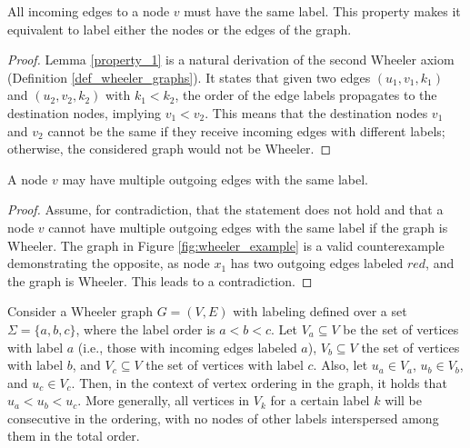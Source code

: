 \begin{lemma} \label{property_1}
    All incoming edges to a node $v$ must have the same label. This property makes it equivalent to label either the nodes or the edges of the graph.
\end{lemma}

\begin{proof}
    Lemma \ref{property_1} is a natural derivation of the second Wheeler axiom (Definition \ref{def_wheeler_graphs}). It states that given two edges $(u_1,v_1,k_1)$ and $(u_2,v_2,k_2)$ with $k_1<k_2$, the order of the edge labels propagates to the destination nodes, implying $v_1<v_2$. This means that the destination nodes $v_1$ and $v_2$ cannot be the same if they receive incoming edges with different labels; otherwise, the considered graph would not be Wheeler.
\end{proof}

\begin{lemma} \label{property_2}
    A node $v$ may have multiple outgoing edges with the same label.
\end{lemma}

\begin{proof}
    Assume, for contradiction, that the statement does not hold and that a node $v$ cannot have multiple outgoing edges with the same label if the graph is Wheeler. The graph in Figure \ref{fig:wheeler_example} is a valid counterexample demonstrating the opposite, as node $x_1$ has two outgoing edges labeled $red$, and the graph is Wheeler. This leads to a contradiction.
\end{proof}

\begin{lemma} \label{property_3}
    Consider a Wheeler graph $G=(V,E)$ with labeling defined over a set $\Sigma=\{a,b,c\}$, where the label order is $a<b<c$. Let $V_a \subseteq V$ be the set of vertices with label $a$ (i.e., those with incoming edges labeled $a$), $V_b \subseteq V$ the set of vertices with label $b$, and $V_c \subseteq V$ the set of vertices with label $c$. Also, let $u_a \in V_a$, $u_b \in V_b$, and $u_c \in V_c$. Then, in the context of vertex ordering in the graph, it holds that $u_a < u_b < u_c$. More generally, all vertices in $V_k$ for a certain label $k$ will be consecutive in the ordering, with no nodes of other labels interspersed among them in the total order.
\end{lemma}

